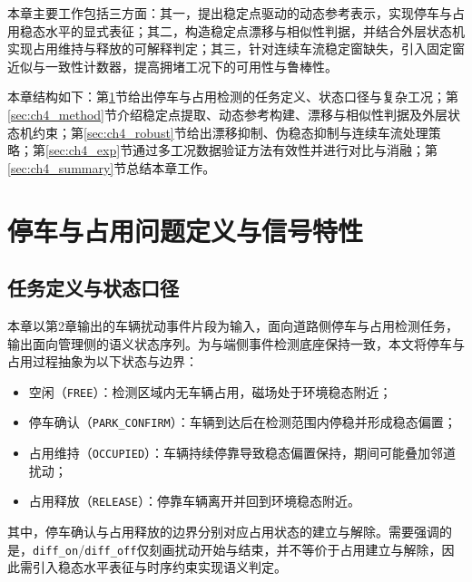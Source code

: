 \documentclass{xdupgthesis}
\begin{document}
本章主要工作包括三方面：其一，提出稳定点驱动的动态参考表示，实现停车与占用稳态水平的显式表征；其二，构造稳定点漂移与相似性判据，并结合外层状态机实现占用维持与释放的可解释判定；其三，针对连续车流稳定窗缺失，引入固定窗近似与一致性计数器，提高拥堵工况下的可用性与鲁棒性。


本章结构如下：第\ref{sec:ch4_problem}节给出停车与占用检测的任务定义、状态口径与复杂工况；第\ref{sec:ch4_method}节介绍稳定点提取、动态参考构建、漂移与相似性判据及外层状态机约束；第\ref{sec:ch4_robust}节给出漂移抑制、伪稳态抑制与连续车流处理策略；第\ref{sec:ch4_exp}节通过多工况数据验证方法有效性并进行对比与消融；第\ref{sec:ch4_summary}节总结本章工作。

\section{停车与占用问题定义与信号特性}
\label{sec:ch4_problem}

\subsection{任务定义与状态口径}
\label{subsec:ch4_def}

本章以第2章输出的车辆扰动事件片段为输入，面向道路侧停车与占用检测任务，输出面向管理侧的语义状态序列。为与端侧事件检测底座保持一致，本文将停车与占用过程抽象为以下状态与边界：
\begin{itemize}
  \item 空闲（\texttt{FREE}）：检测区域内无车辆占用，磁场处于环境稳态附近；
  \item 停车确认（\texttt{PARK\_CONFIRM}）：车辆到达后在检测范围内停稳并形成稳态偏置；
  \item 占用维持（\texttt{OCCUPIED}）：车辆持续停靠导致稳态偏置保持，期间可能叠加邻道扰动；
  \item 占用释放（\texttt{RELEASE}）：停靠车辆离开并回到环境稳态附近。
\end{itemize}
其中，停车确认与占用释放的边界分别对应占用状态的建立与解除。需要强调的是，\texttt{diff\_on}/\texttt{diff\_off}仅刻画扰动开始与结束，并不等价于占用建立与解除，因此需引入稳态水平表征与时序约束实现语义判定。
\end{document}
